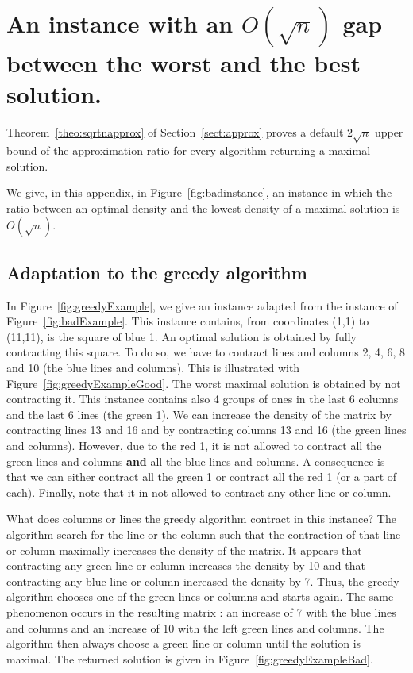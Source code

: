 \section{An instance with an $O(\sqrt{n})$ gap between the worst and the best solution.}

\label{apx:badinstance}


Theorem~\ref{theo:sqrtnapprox} of Section~\ref{sect:approx} proves a default $2\sqrt{n}$ upper bound of the approximation ratio for every algorithm returning a maximal solution.

We give, in this appendix, in Figure~\ref{fig:badinstance}, an instance in which the ratio between an optimal density and the lowest density of a maximal solution is $O(\sqrt{n})$.





\subsection{Adaptation to the greedy algorithm}

In Figure~\ref{fig:greedyExample}, we give an instance adapted from the instance of Figure~\ref{fig:badExample}. This instance contains, from coordinates (1,1) to (11,11), is the square of blue 1. An optimal solution is obtained by fully contracting this square. To do so, we have to contract lines and columns 2, 4, 6, 8 and 10 (the blue lines and columns). This is illustrated with Figure~\ref{fig:greedyExampleGood}. The worst maximal solution is obtained by not contracting it. This instance contains also 4 groups of ones in the last 6 columns and the last 6 lines (the green 1). We can increase the density of the matrix by contracting lines 13 and 16 and by contracting columns 13 and 16 (the green lines and columns). However, due to the red 1, it is not allowed to contract all the green lines and columns \textbf{and} all the blue lines and columns. A consequence is that we can either contract all the green 1 or contract all the red 1 (or a part of each). Finally, note that it in not allowed to contract any other line or column.

What does columns or lines the greedy algorithm contract in this instance? The algorithm search for the line or the column such that the contraction of that line or column maximally increases the density of the matrix. It appears that contracting any green line or column increases the density by 10 and that contracting any blue line or column increased the density by 7. Thus, the greedy algorithm chooses one of the green lines or columns and starts again. The same phenomenon occurs in the resulting matrix : an increase of 7 with the blue lines and columns and an increase of 10 with the left green lines and columns. The algorithm then always choose a green line or column until the solution is maximal. The returned solution is given in Figure~\ref{fig:greedyExampleBad}.



